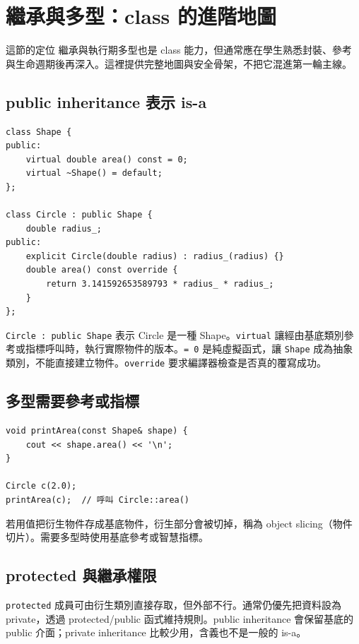 \documentclass[11pt,a4paper]{article}
\newcommand{\code}[1]{\texttt{#1}}
\begin{document}
\section{繼承與多型：class 的進階地圖}

\begin{skipbox}{這節的定位}
繼承與執行期多型也是 class 能力，但通常應在學生熟悉封裝、參考與生命週期後再深入。這裡提供完整地圖與安全骨架，不把它混進第一輪主線。
\end{skipbox}

\subsection{public inheritance 表示 is-a}

\begin{lstlisting}
class Shape {
public:
    virtual double area() const = 0;
    virtual ~Shape() = default;
};

class Circle : public Shape {
    double radius_;
public:
    explicit Circle(double radius) : radius_(radius) {}
    double area() const override {
        return 3.141592653589793 * radius_ * radius_;
    }
};
\end{lstlisting}

\code{Circle : public Shape} 表示 Circle 是一種 Shape。\code{virtual} 讓經由基底類別參考或指標呼叫時，執行實際物件的版本。\code{= 0} 是純虛擬函式，讓 \code{Shape} 成為抽象類別，不能直接建立物件。\code{override} 要求編譯器檢查是否真的覆寫成功。

\subsection{多型需要參考或指標}

\begin{lstlisting}
void printArea(const Shape& shape) {
    cout << shape.area() << '\n';
}

Circle c(2.0);
printArea(c);  // 呼叫 Circle::area()
\end{lstlisting}

若用值把衍生物件存成基底物件，衍生部分會被切掉，稱為 object slicing（物件切片）。需要多型時使用基底參考或智慧指標。

\subsection{protected 與繼承權限}

\code{protected} 成員可由衍生類別直接存取，但外部不行。通常仍優先把資料設為 private，透過 protected/public 函式維持規則。public inheritance 會保留基底的 public 介面；private inheritance 比較少用，含義也不是一般的 is-a。
\end{document}
